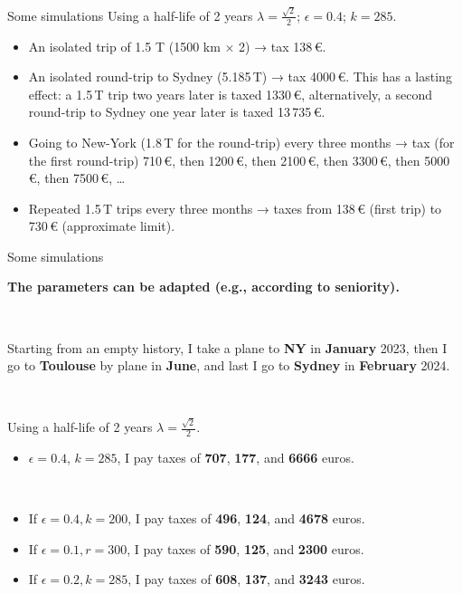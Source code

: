 \documentclass[french, english]{beamer}
\begin{document}
\begin{frame}{Some simulations}
    Using a half-life of 2 years $\lambda = \frac{\sqrt{2}}{2}$; $\epsilon = 0.4$; $k = 285$.
    \begin{itemize}
    	\item An isolated trip of 1.5 T (1500 km × 2) → tax 138\,€.
	\item An isolated round-trip to Sydney (5.185\,T) → tax 4000\,€. This has a lasting effect: a 1.5\,T trip two years later is taxed 1330\,€, alternatively, a second round-trip to Sydney one year later is taxed 13\,735\,€.
	\item Going to New-York (1.8\,T for the round-trip) every three months → tax (for the first round-trip) 710\,€, then 1200\,€, then 2100\,€, then 3300\,€, then 5000\,€, then 7500\,€, …
	\item Repeated 1.5\,T trips every three months → taxes from 138\,€ (first trip) to 730\,€ (approximate limit).
	\end{itemize}
\end{frame}

\begin{frame}{Some simulations}

    \textbf{The parameters can be adapted (e.g., according to seniority).}
    
    \
    
    Starting from an empty history, I take a plane to \textbf{NY} in \textbf{January} 2023, then I go to \textbf{Toulouse} by plane in \textbf{June}, and  last I go to \textbf{Sydney} in \textbf{February} 2024. 
    
    \
    
    Using a half-life of 2 years $\lambda = \frac{\sqrt{2}}{2}$.
    \begin{itemize}
    \item $\epsilon = 0.4$, $k=285$, I pay taxes of \textbf{707}, \textbf{177}, and \textbf{6666} euros.
    \end{itemize}
    
    \
    
    \begin{itemize}
    \item If $\epsilon = 0.4, k = 200$, I pay taxes of \textbf{496}, \textbf{124}, and \textbf{4678} euros. 
    \item If $\epsilon = 0.1, r = 300$, I pay taxes of \textbf{590}, \textbf{125}, and \textbf{2300} euros.
    \item If $\epsilon = 0.2, k = 285$, I pay taxes of \textbf{608}, \textbf{137}, and \textbf{3243} euros. 
    \end{itemize}
\end{frame}
\end{document}
